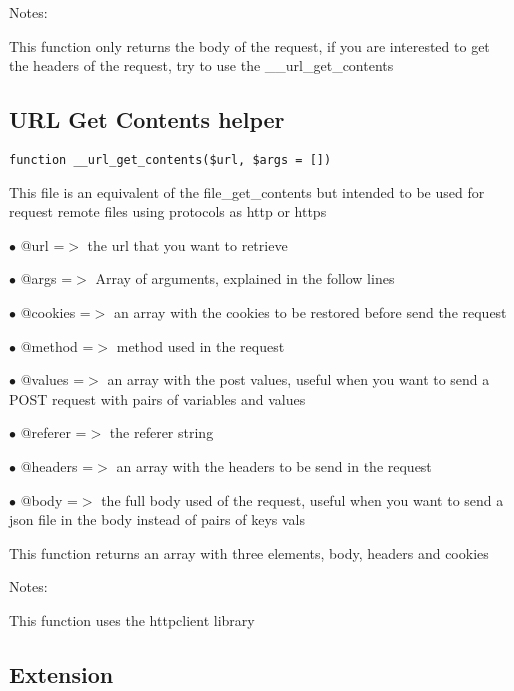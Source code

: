 \documentclass[a4paper]{book}
\begin{document}
Notes:

This function only returns the body of the request, if you are interested
to get the headers of the request, try to use the \_\_url\_get\_contents

\hypertarget{toc125}{}
\subsection{URL Get Contents helper}

\begin{lstlisting}
function __url_get_contents($url, $args = [])
\end{lstlisting}

This file is an equivalent of the file\_get\_contents but intended to be used
for request remote files using protocols as http or https

\begin{compactitem}
\item[\color{myblue}$\bullet$] @url     =$>$ the url that you want to retrieve
\item[\color{myblue}$\bullet$] @args    =$>$ Array of arguments, explained in the follow lines
\item[\color{myblue}$\bullet$] @cookies =$>$ an array with the cookies to be restored before send the request
\item[\color{myblue}$\bullet$] @method  =$>$ method used in the request
\item[\color{myblue}$\bullet$] @values  =$>$ an array with the post values, useful when you want to send a POST
            request with pairs of variables and values
\item[\color{myblue}$\bullet$] @referer =$>$ the referer string
\item[\color{myblue}$\bullet$] @headers =$>$ an array with the headers to be send in the request
\item[\color{myblue}$\bullet$] @body    =$>$ the full body used of the request, useful when you want to send a
            json file in the body instead of pairs of keys vals
\end{compactitem}

This function returns an array with three elements, body, headers and cookies

Notes:

This function uses the httpclient library

\hypertarget{toc126}{}
\subsection{Extension}
\end{document}
